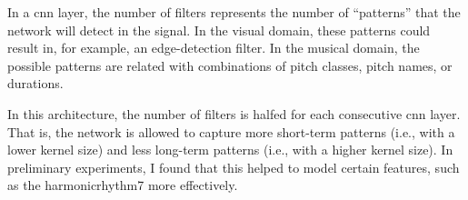 
In a \gls{cnn} layer, the number of filters represents the
number of ``patterns'' that the network will detect in the
signal. In the visual domain, these patterns could result
in, for example, an edge-detection filter. In the musical
domain, the possible patterns are related with combinations
of pitch classes, pitch names, or durations.

In this architecture, the number of filters is halfed for
each consecutive \gls{cnn} layer. That is, the network is
allowed to capture more short-term patterns (i.e., with a
lower kernel size) and less long-term patterns (i.e., with a
higher kernel size). In preliminary experiments, I found
that this helped to model certain features, such as the
\gls{harmonicrhythm7} more effectively.
